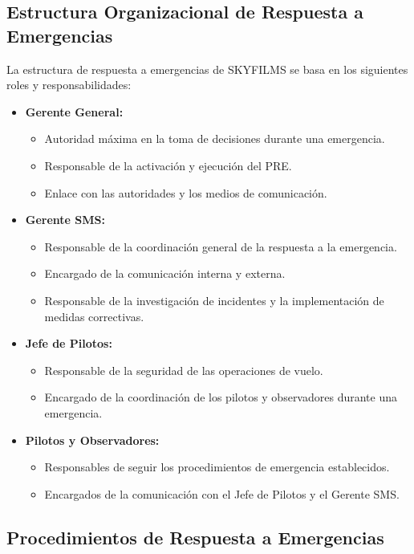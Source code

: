 \subsection{Estructura Organizacional de Respuesta a Emergencias}
La estructura de respuesta a emergencias de SKYFILMS se basa en los siguientes roles y responsabilidades:

\begin{itemize}
    \item \textbf{Gerente General:}
        \begin{itemize}
            \item Autoridad máxima en la toma de decisiones durante una emergencia.
            \item Responsable de la activación y ejecución del PRE.
            \item Enlace con las autoridades y los medios de comunicación.
        \end{itemize}
    \item \textbf{Gerente SMS:}
        \begin{itemize}
            \item Responsable de la coordinación general de la respuesta a la emergencia.
            \item Encargado de la comunicación interna y externa.
            \item Responsable de la investigación de incidentes y la implementación de medidas correctivas.
        \end{itemize}
    \item \textbf{Jefe de Pilotos:}
        \begin{itemize}
            \item Responsable de la seguridad de las operaciones de vuelo.
            \item Encargado de la coordinación de los pilotos y observadores durante una emergencia.
        \end{itemize}
    \item \textbf{Pilotos y Observadores:}
        \begin{itemize}
            \item Responsables de seguir los procedimientos de emergencia establecidos.
            \item Encargados de la comunicación con el Jefe de Pilotos y el Gerente SMS.
        \end{itemize}
\end{itemize}

\subsection{Procedimientos de Respuesta a Emergencias}

